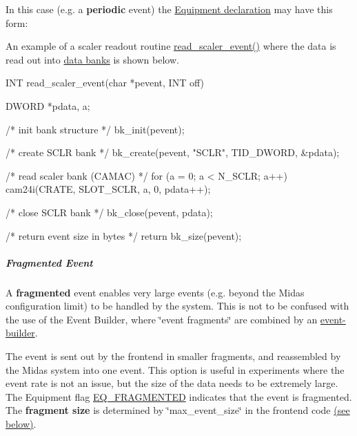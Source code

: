 In this case (e.g. a {\bfseries periodic} event) the \hyperlink{FE_eqdec_FE_Example_equipment_structure}{Equipment declaration} may have this form: 
\begin{DoxyCode}
    EQUIPMENT equipment[] = {
      { "Scaler",           // equipment name
         {    
            ...
            EQ_PERIODIC     // equipment type
            0,              // interrupt source (ignored) 
            ...
            10000,          // period (read every 10s)
            ...
            "", "", "",},
       read_scaler_event,   // readout routine 
       ...
\end{DoxyCode}


An example of a scaler readout routine \hyperlink{fevmemodules_8c_af3ad062393c1437922bae26841d8927c}{read\_\-scaler\_\-event()} where the data is read out into \hyperlink{FE_bank_construction}{data banks} is shown below. 
\begin{DoxyCode}
INT read_scaler_event(char *pevent, INT off)
{
   DWORD *pdata, a;

   /* init bank structure */
   bk_init(pevent);

   /* create SCLR bank */
   bk_create(pevent, "SCLR", TID_DWORD, &pdata);

   /* read scaler bank (CAMAC) */
   for (a = 0; a < N_SCLR; a++)
      cam24i(CRATE, SLOT_SCLR, a, 0, pdata++);
    
   /* close SCLR bank */
   bk_close(pevent, pdata);

   /* return event size in bytes */
   return bk_size(pevent);
}
\end{DoxyCode}


\par
 

 \par


\label{FE_eq_event_routines_idx_event_fragmented}
\hypertarget{FE_eq_event_routines_idx_event_fragmented}{}
 \hypertarget{FE_eq_event_routines_FE_fragmented_event}{}\subparagraph{Fragmented Event}\label{FE_eq_event_routines_FE_fragmented_event}
A {\bfseries fragmented} event enables very large events (e.g. beyond the Midas configuration limit) to be handled by the system. This is not to be confused with the use of the Event Builder, where \char`\"{}event fragments\char`\"{} are combined by an \hyperlink{FE_Event_Builder_FE_mevb_utility}{event-\/builder}.

The event is sent out by the frontend in smaller fragments, and reassembled by the Midas system into one event. This option is useful in experiments where the event rate is not an issue, but the size of the data needs to be extremely large. The Equipment flag \hyperlink{FE_table_FE_tbl_EqFragmented}{EQ\_\-FRAGMENTED} indicates that the event is fragmented. The {\bfseries fragment size} is determined by \char`\"{}max\_\-event\_\-size\char`\"{} in the frontend code \hyperlink{FE_eq_event_routines_FE_frag_max_event_size}{(see below)}.

